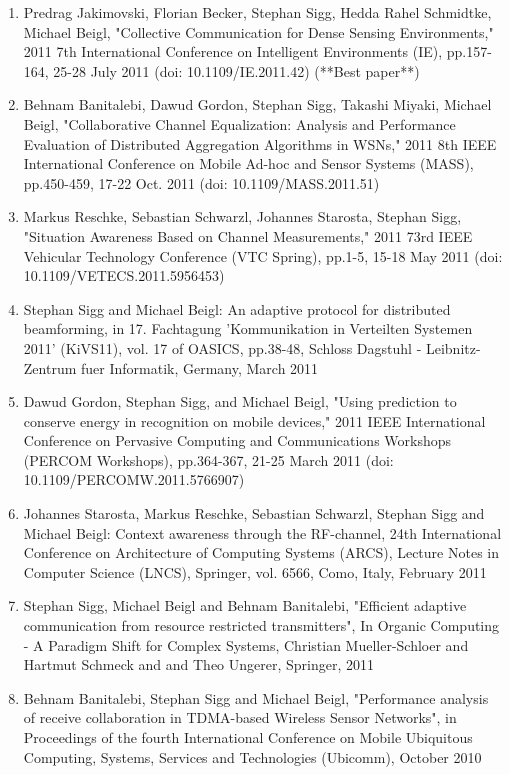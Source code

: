 \documentclass[12pt]{article}
\begin{document}
\begin{enumerate}
\item Predrag Jakimovski, Florian Becker, Stephan Sigg, Hedda Rahel Schmidtke, Michael Beigl, "Collective Communication for Dense Sensing Environments," 2011 7th International Conference on Intelligent Environments (IE), pp.157-164, 25-28 July 2011 (doi: 10.1109/IE.2011.42) (**Best paper**)
\item Behnam Banitalebi, Dawud Gordon, Stephan Sigg, Takashi Miyaki, Michael Beigl, "Collaborative Channel Equalization: Analysis and Performance Evaluation of Distributed Aggregation Algorithms in WSNs," 2011 8th IEEE International Conference on Mobile Ad-hoc and Sensor Systems (MASS), pp.450-459, 17-22 Oct. 2011 (doi: 10.1109/MASS.2011.51)
\item Markus Reschke, Sebastian Schwarzl, Johannes Starosta, Stephan Sigg, "Situation Awareness Based on Channel Measurements," 2011 73rd IEEE Vehicular Technology Conference (VTC Spring), pp.1-5, 15-18 May 2011 (doi: 10.1109/VETECS.2011.5956453)
\item Stephan Sigg and Michael Beigl: An adaptive protocol for distributed beamforming, in 17. Fachtagung 'Kommunikation in Verteilten Systemen 2011' (KiVS11), vol. 17 of OASICS, pp.38-48, Schloss Dagstuhl - Leibnitz-Zentrum fuer Informatik, Germany, March 2011
\item Dawud Gordon, Stephan Sigg, and Michael Beigl, "Using prediction to conserve energy in recognition on mobile devices," 2011 IEEE International Conference on Pervasive Computing and Communications Workshops (PERCOM Workshops), pp.364-367, 21-25 March 2011 (doi: 10.1109/PERCOMW.2011.5766907)
\item Johannes Starosta, Markus Reschke, Sebastian Schwarzl, Stephan Sigg and Michael Beigl: Context awareness through the RF-channel, 24th International Conference on Architecture of Computing Systems (ARCS), Lecture Notes in Computer Science (LNCS), Springer, vol. 6566, Como, Italy, February 2011
\item Stephan Sigg, Michael Beigl and Behnam Banitalebi, "Efficient adaptive communication from resource restricted transmitters", In Organic Computing - A Paradigm Shift for Complex Systems, Christian Mueller-Schloer and Hartmut Schmeck and and Theo Ungerer, Springer, 2011
\item Behnam Banitalebi, Stephan Sigg and Michael Beigl, "Performance analysis of receive collaboration in TDMA-based Wireless Sensor Networks", in Proceedings of the fourth International Conference on Mobile Ubiquitous Computing, Systems, Services and Technologies (Ubicomm), October 2010

\end{enumerate}
\end{document}
